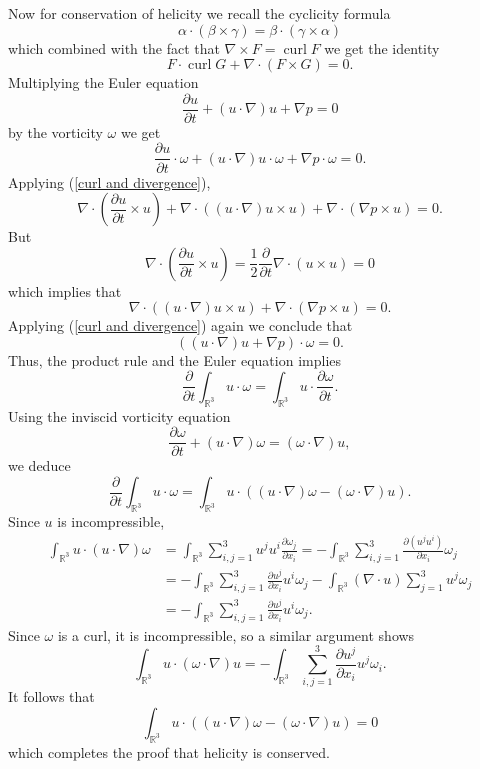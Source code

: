 \documentclass[10pt]{article}
\newcommand{\RR}{\mathbb{R}}
\DeclareMathOperator{\curl}{curl}
\theoremstyle{definition}
\begin{document}
Now for conservation of helicity we recall the cyclicity formula
$$\alpha \cdot (\beta \times \gamma) = \beta \cdot (\gamma \times \alpha)$$
which combined with the fact that $\nabla \times F = \curl F$ we get the identity
\begin{equation}
\label{curl and divergence}
F \cdot \curl G + \nabla \cdot(F \times G) = 0.
\end{equation}
Multiplying the Euler equation
$$\frac{\partial u}{\partial t} + (u \cdot \nabla)u + \nabla p = 0$$
by the vorticity $\omega$ we get
$$\frac{\partial u}{\partial t} \cdot \omega + (u \cdot \nabla)u \cdot \omega + \nabla p \cdot \omega = 0.$$
Applying (\ref{curl and divergence}),
$$\nabla \cdot \left(\frac{\partial u}{\partial t} \times u\right) + \nabla \cdot ((u \cdot \nabla)u \times u) + \nabla \cdot (\nabla p \times u) = 0.$$
But
$$\nabla \cdot \left(\frac{\partial u}{\partial t} \times u\right) = \frac{1}{2} \frac{\partial}{\partial t} \nabla \cdot(u \times u) = 0$$
which implies that
$$\nabla \cdot ((u \cdot \nabla)u \times u) + \nabla \cdot (\nabla p \times u) = 0.$$
Applying (\ref{curl and divergence}) again we conclude that
$$((u \cdot \nabla)u + \nabla p) \cdot \omega = 0.$$
Thus, the product rule and the Euler equation implies
$$\frac{\partial}{\partial t} \int_{\RR^3} u \cdot \omega = \int_{\RR^3} u \cdot \frac{\partial \omega}{\partial t}.$$
Using the inviscid vorticity equation
$$\frac{\partial \omega}{\partial t} + (u \cdot \nabla)\omega = (\omega \cdot \nabla)u,$$
we deduce
$$\frac{\partial}{\partial t} \int_{\RR^3} u \cdot \omega = \int_{\RR^3} u \cdot \left((u \cdot \nabla)\omega - (\omega \cdot \nabla)u\right).$$
Since $u$ is incompressible,
\begin{align*}
\int_{\RR^3} u \cdot (u \cdot \nabla)\omega
&= \int_{\RR^3} \sum_{i,j=1}^3 u^ju^i\frac{\partial \omega_j}{\partial x_i}
= -\int_{\RR^3} \sum_{i,j=1}^3 \frac{\partial(u^ju^i)}{\partial x_i} \omega_j \\
&= -\int_{\RR^3} \sum_{i,j=1}^3 \frac{\partial u^j}{\partial x_i} u^i \omega_j - \int_{\RR^3} (\nabla \cdot u)\sum_{j=1}^3 u^j \omega_j\\
&= -\int_{\RR^3} \sum_{i,j=1}^3 \frac{\partial u^j}{\partial x_i} u^i \omega_j.
\end{align*}
Since $\omega$ is a curl, it is incompressible, so a similar argument shows
$$\int_{\RR^3} u \cdot (\omega \cdot \nabla)u = -\int_{\RR^3} \sum_{i,j=1}^3 \frac{\partial u^j}{\partial x_i} u^j \omega_i.$$
It follows that
$$\int_{\RR^3} u \cdot \left((u \cdot \nabla)\omega - (\omega \cdot \nabla)u\right) = 0$$
which completes the proof that helicity is conserved.
\end{document}
